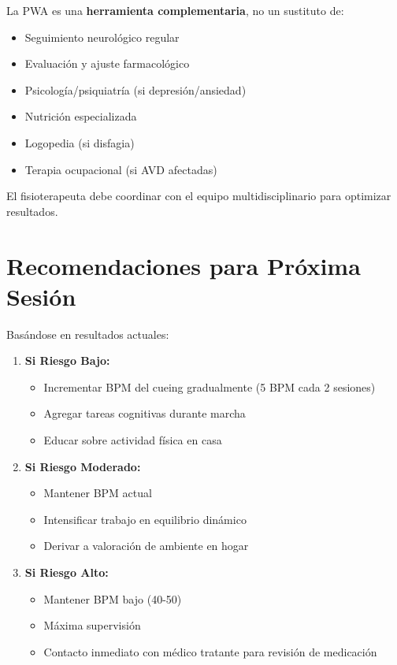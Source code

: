 \documentclass[12pt,a4paper,spanish,oneside]{book}
\begin{document}
La PWA es una \textbf{herramienta complementaria}, no un sustituto de:

\begin{itemize}
  \item Seguimiento neurológico regular
  \item Evaluación y ajuste farmacológico
  \item Psicología/psiquiatría (si depresión/ansiedad)
  \item Nutrición especializada
  \item Logopedia (si disfagia)
  \item Terapia ocupacional (si AVD afectadas)
\end{itemize}

El fisioterapeuta debe coordinar con el equipo multidisciplinario para optimizar resultados.

\section{Recomendaciones para Próxima Sesión}

Basándose en resultados actuales:

\begin{enumerate}
  \item \textbf{Si Riesgo Bajo:}
  \begin{itemize}
    \item Incrementar BPM del cueing gradualmente (5 BPM cada 2 sesiones)
    \item Agregar tareas cognitivas durante marcha
    \item Educar sobre actividad física en casa
  \end{itemize}
  
  \item \textbf{Si Riesgo Moderado:}
  \begin{itemize}
    \item Mantener BPM actual
    \item Intensificar trabajo en equilibrio dinámico
    \item Derivar a valoración de ambiente en hogar
  \end{itemize}
  
  \item \textbf{Si Riesgo Alto:}
  \begin{itemize}
    \item Mantener BPM bajo (40-50)
    \item Máxima supervisión
    \item Contacto inmediato con médico tratante para revisión de medicación
  \end{itemize}
\end{enumerate}
\end{document}
